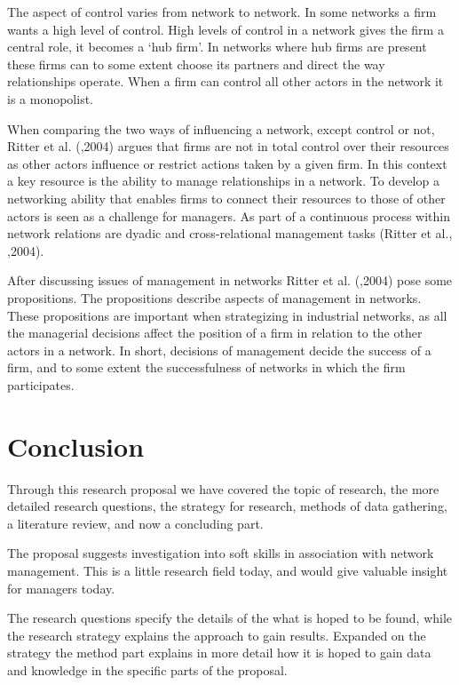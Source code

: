 \documentclass[12pt,journal,compsoc]{IEEEtran}
\begin{document}
The aspect of control varies from network to network. In some networks a firm wants a high level of control. High levels of control in a network gives the firm a central role, it becomes a ‘hub firm’. In networks where hub firms are present these firms can to some extent choose its partners and direct the way relationships operate. When a firm can control all other actors in the network it is a monopolist.

When comparing the two ways of influencing a network, except control or not,
Ritter et al. (\cite{ritter},2004) argues that firms are not in total control
over their resources as other actors influence or restrict actions taken by a
given firm. In this context a key resource is the ability to manage
relationships in a network. To develop a networking ability that enables firms
to connect their resources to those of other actors is seen as a challenge for
managers. As part of a continuous process within network relations are dyadic
and cross-relational management tasks (Ritter et al., \cite{ritter},2004).

After discussing issues of management in networks Ritter et al.
(\cite{ritter},2004) pose some propositions. The propositions describe aspects
of management in networks. These propositions are important when strategizing in
industrial networks, as all the managerial decisions affect the position of a
firm in relation to the other actors in a network. In short, decisions of
management decide the success of a firm, and to some extent the successfulness
of networks in which the firm participates. 

\section{Conclusion}

Through this research proposal we have covered the topic of research, the more
detailed research questions, the strategy for research, methods of data
gathering, a literature review, and now a concluding part. 

The proposal suggests investigation into soft skills in association with
network management. This is a little research field today, and would give
valuable insight for managers today.

The research questions specify the details of the what is hoped to be found,
while the research strategy explains the approach to gain results. Expanded on
the strategy the method part explains in more detail how it is hoped to gain
data and knowledge in the specific parts of the proposal. 
\end{document}

